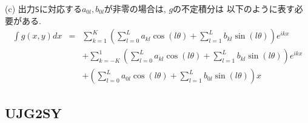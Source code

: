 \documentclass[a4j,fleqn]{jarticle}
\begin{document}
\begin{enumerate}
(c) 出力{\tt S}に対応する$a_{0l},b_{0l}$が非零の場合は, $g$の不定積分は
 以下のように表す必要がある.
\begin{eqnarray*}
\int g(x,y) dx
&=&\sum^K_{k=1}\left(\sum^L_{l=0}a_{kl}\cos(l\theta)
+\sum^L_{l=1}b_{kl}\sin(l\theta)\right)
e^{ikx}\\
& &+\sum^1_{k=-K}\left(\sum^L_{l=0}a_{kl}\cos(l\theta)
+\sum^L_{l=1}b_{kl}\sin(l\theta)\right)
e^{ikx}\\
& &+\left(\sum^L_{l=0}a_{0l}\cos(l\theta)
+\sum^L_{l=1}b_{0l}\sin(l\theta)\right)x
\end{eqnarray*}

\end{enumerate}


\subsection{UJG2SY}
\end{document}
